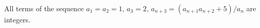 All terms of the sequence $a_1 = a_2 = 1$, $a_3 = 2$, $a_{n+3} = (a_{n+1}a_{n+2} + 5)/a_n$ are integers.

